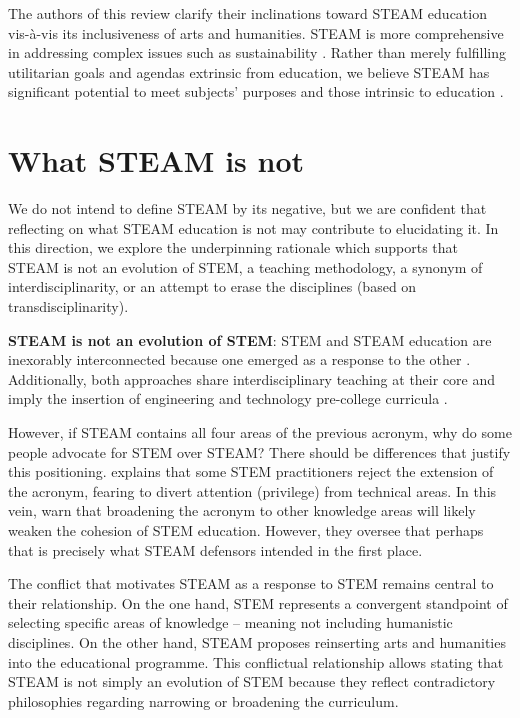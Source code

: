 \documentclass[english]{textolivre}
\begin{document}
The authors of this review clarify their inclinations toward STEAM education vis-à-vis its inclusiveness of arts and humanities. STEAM is more comprehensive in addressing complex issues such as sustainability \cite{rodrigues-silva_stem/steam_2023b, brundtland1987}. Rather than merely fulfilling utilitarian goals and agendas extrinsic from education, we believe STEAM has significant potential to meet subjects’ purposes and those intrinsic to education \cite{biesta_por_2022, rodrigues-silva_stem/steam_2023b}.

\section{What STEAM is not}

We do not intend to define STEAM by its negative, but we are confident that reflecting on what STEAM education is not may contribute to elucidating it. In this direction, we explore the underpinning rationale which supports that STEAM is not an evolution of STEM, a teaching methodology, a synonym of interdisciplinarity, or an attempt to erase the disciplines (based on transdisciplinarity).

\textbf{STEAM is not an evolution of STEM}: STEM and STEAM education are inexorably interconnected because one emerged as a response to the other \cite{perignat_steam_2019}. Additionally, both approaches share interdisciplinary teaching at their core and imply the insertion of engineering and technology pre-college curricula \cite{moore_framework_2014}.

However, if STEAM contains all four areas of the previous acronym, why do some people advocate for STEM over STEAM? There should be differences that justify this positioning. \textcite{khine_creating_2019} explains that some STEM practitioners reject the extension of the acronym, fearing to divert attention (privilege) from technical areas. In this vein, \textcite{clements_stem_2021} warn that broadening the acronym to other knowledge areas will likely weaken the cohesion of STEM education. However, they oversee that perhaps that is precisely what STEAM defensors intended in the first place.

The conflict that motivates STEAM as a response to STEM remains central to their relationship. On the one hand, STEM represents a convergent standpoint of selecting specific areas of knowledge – meaning not including humanistic disciplines. On the other hand, STEAM proposes reinserting arts and humanities into the educational programme. This conflictual relationship allows stating that STEAM is not simply an evolution of STEM because they reflect contradictory philosophies regarding narrowing or broadening the curriculum.
\end{document}
